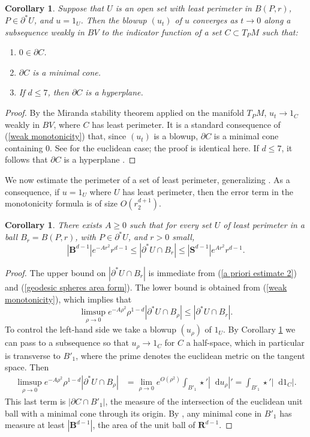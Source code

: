 \documentclass[reqno,11pt]{amsart}
\newcommand{\RR}{\mathbf{R}}
\newcommand{\Sph}{\mathbf S}
\newcommand{\Ball}{\mathbf{B}}
\newcommand*\dif{\mathop{}\!\mathrm{d}}
\newtheorem{corollary}[theorem]{Corollary}
\theoremstyle{definition}
\numberwithin{equation}{section}
\begin{document}
\begin{corollary}\label{blowup theorem}
Suppose that $U$ is an open set with least perimeter in $B(P, r)$, $P \in \partial^* U$, and $u = 1_U$.
Then the blowup $(u_t)$ of $u$ converges as $t \to 0$ along a subsequence weakly in $BV$ to the indicator function of a set $C \subset T_PM$ such that:
\begin{enumerate}
\item $0 \in \partial C$.
\item $\partial C$ is a minimal cone.
\item If $d \leq 7$, then $\partial C$ is a hyperplane.
\end{enumerate}
\end{corollary}
\begin{proof}
By the Miranda stability theorem applied on the manifold $T_PM$, $u_t \to 1_C$ weakly in $BV$, where $C$ has least perimeter.
It is a standard consequence of (\ref{weak monotonicity}) that, since $(u_t)$ is a blowup, $\partial C$ is a minimal cone containing $0$.
See \cite[Theorem 9.3]{Giusti77} for the euclidean case; the proof is identical here.
If $d \leq 7$, it follows that $\partial C$ is a hyperplane \cite[Theorem 9.10 and Theorem 10.10]{Giusti77}.
\end{proof}

We now estimate the perimeter of a set of least perimeter, generalizing \cite[Remark 5.13]{Giusti77}.
As a consequence, if $u = 1_U$ where $U$ has least perimeter, then the error term in the monotonicity formula is of size $O(r_2^{d + 1})$.

\begin{corollary}\label{doubling dimension}
There exists $A \geq 0$ such that for every set $U$ of least perimeter in a ball $B_r = B(P, r)$, with $P \in \partial^* U$, and $r > 0$ small,
$$|\Ball^{d - 1}|e^{-Ar^2}r^{d - 1} \leq |\partial^*U \cap B_r| \leq |\Sph^{d - 1}|e^{Ar^2} r^{d - 1}.$$
\end{corollary}
\begin{proof}
The upper bound on $|\partial^* U \cap B_r|$ is immediate from (\ref{a priori estimate 2}) and (\ref{geodesic spheres area form}).
The lower bound is obtained from (\ref{weak monotonicity}), which implies that
$$\limsup_{\rho \to 0} e^{-A\rho^2} \rho^{1 - d} |\partial^* U \cap B_\rho| \leq |\partial^* U \cap B_r|.$$
To control the left-hand side we take a blowup $(u_\rho)$ of $1_U$.
By Corollary \ref{blowup theorem} we can pass to a subsequence so that $u_\rho \to 1_C$ for $C$ a half-space, which in particular is transverse to $B'_1$, where the prime denotes the euclidean metric on the tangent space.
Then
\begin{align*}
\limsup_{\rho \to 0} e^{-A\rho^2} \rho^{1 - d} |\partial^* U \cap B_\rho| &= \lim_{\rho \to 0} e^{O(\rho^2)} \int_{B'_1} \star'|\dif u_\rho|' = \int_{B'_1} \star'|\dif 1_C|.
\end{align*}
This last term is $|\partial C \cap B'_1|$, the measure of the intersection of the euclidean unit ball with a minimal cone through its origin.
By \cite[(5.16)]{Giusti77}, any minimal cone in $B'_1$ has measure at least $|\Ball^{d - 1}|$, the area of the unit ball of $\RR^{d - 1}$.
\end{proof}
\end{document}
